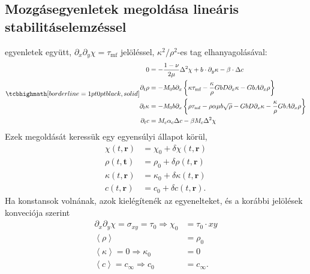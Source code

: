 \documentclass[10pt,a4paper]{scrartcl}
\let\mathbf\bm
\begin{document}
\subsection{Mozgásegyenletek megoldása lineáris stabilitáselemzéssel}
 egyenletek együtt, $\partial_x \partial_y \chi = {\tau _{{\text{mf}}}}$ jelöléssel, $\kappa^2/\rho^2$-es tag elhanyagolásával:
\begin{gather} \label{eq:eom}
\tcbhighmath[borderline={1pt}{0pt}{black,solid}]{
\begin{aligned}
0 & = - \frac{{1 - \nu }}{{2\mu }}{\Delta ^2}\chi  + b\cdot\partial_y\kappa - \beta  \cdot \Delta c \\ 
    {\partial _t}\rho  &  =  - {M_0}b{\partial _x}\left\{ {\kappa {\tau _{{\text{mf}}}} - \frac{\kappa }{\rho }GbD{\partial _x}\kappa  - GbA{\partial _x}\rho } \right\} \\ 
  {\partial _t}\kappa  &  =  - {M_0}b{\partial _x}\left\{ {\rho {\tau _{{\text{mf}}}} - \rho \alpha \mu b\sqrt \rho - GbD{\partial _x}\kappa  - \frac{\kappa }{\rho } GbA{\partial _x}\rho } \right\} \\
  \partial_t c & =  {M_c}{\alpha _c}\Delta c - \beta {M_c}\Delta^2 \chi
\end{aligned}  }
\end{gather}
Ezek megoldását keressük egy egyensúlyi állapot körül,
\[\begin{aligned}
  \chi \left( {t,{\mathbf{r}}} \right) &  = {\chi _0} + \delta \chi \left( {t,{\mathbf{r}}} \right) \\ 
  \rho \left( {t,{\mathbf{t}}} \right) &  = {\rho _0} + \delta \rho \left( {t,{\mathbf{r}}} \right) \\ 
  \kappa \left( {t,{\mathbf{r}}} \right) &  = {\kappa _0} + \delta \kappa \left( {t,{\mathbf{r}}} \right) \\ 
  c\left( {t,{\mathbf{r}}} \right) &  = {c_0} + \delta c\left( {t,{\mathbf{r}}} \right).
\end{aligned} \]
Ha konstansok volnának, azok kielégítenék az egyenelteket, és a korábbi jelölések konveciója szerint 
\[\begin{aligned}
  {\partial _x}{\partial _y}\chi  = {\sigma _{xy}} = {\tau _0} \Rightarrow {\chi _0} &  = {\tau _0} \cdot xy \\ 
  \left\langle \rho  \right\rangle  &  = {\rho _0} \\ 
  \left\langle \kappa  \right\rangle  = 0 \Rightarrow {\kappa _0} &  = 0 \\ 
  \left\langle c \right\rangle  = {c_\infty } \Rightarrow {c_0} &  = {c_\infty }. \\ 
\end{aligned} \]
\end{document}
